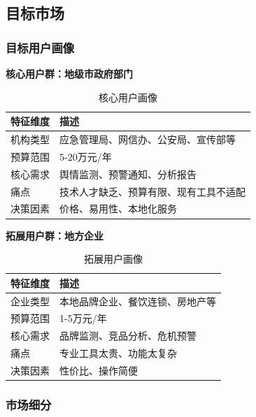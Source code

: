 \subsection{目标市场}

\subsubsection{目标用户画像}

\textbf{核心用户群：地级市政府部门}

\begin{table}[H]
	\centering
	\caption{核心用户画像}
	\begin{tabular}{L{3cm}L{10cm}}
		\toprule
		\textbf{特征维度} & \textbf{描述}         \\
		\midrule
		机构类型          & 应急管理局、网信办、公安局、宣传部等  \\
		预算范围          & 5-20万元/年            \\
		核心需求          & 舆情监测、预警通知、分析报告      \\
		痛点            & 技术人才缺乏、预算有限、现有工具不适配 \\
		决策因素          & 价格、易用性、本地化服务        \\
		\bottomrule
	\end{tabular}
\end{table}

\textbf{拓展用户群：地方企业}

\begin{table}[H]
	\centering
	\caption{拓展用户画像}
	\begin{tabular}{L{3cm}L{10cm}}
		\toprule
		\textbf{特征维度} & \textbf{描述}      \\
		\midrule
		企业类型          & 本地品牌企业、餐饮连锁、房地产等 \\
		预算范围          & 1-5万元/年          \\
		核心需求          & 品牌监测、竞品分析、危机预警   \\
		痛点            & 专业工具太贵、功能太复杂     \\
		决策因素          & 性价比、操作简便         \\
		\bottomrule
	\end{tabular}
\end{table}

\subsubsection{市场细分}

